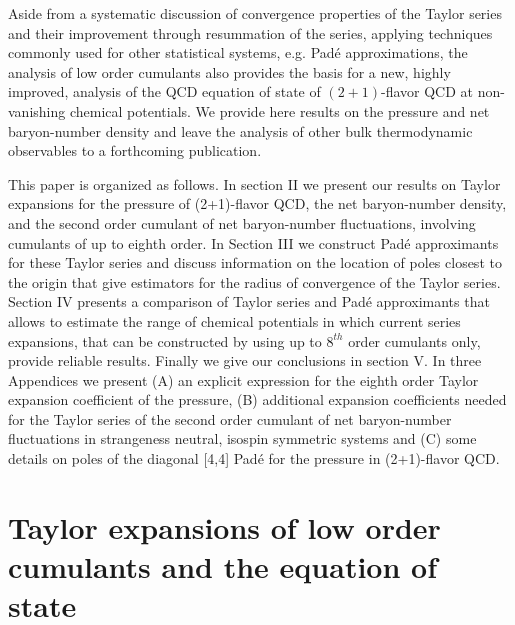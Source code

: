 \documentclass[pdflatex,prd,twocolumn,showpacs,superscriptaddress,nofootinbib]{revtex4-1}
\begin{document}
Aside from a systematic discussion of convergence properties of the Taylor series and their improvement through resummation of the 
series, applying techniques commonly used for other statistical
systems, e.g. Pad\'e approximations,
the analysis of low order 
cumulants also provides the basis for a new, highly improved, 
analysis of the QCD equation of state of $(2+1)$-flavor QCD at non-vanishing chemical potentials. 
We provide here results on the pressure and 
net baryon-number density and leave the analysis
of other bulk thermodynamic observables to a forthcoming publication.

This paper is organized as follows. In section II 
we present our results on Taylor expansions for 
the pressure of (2+1)-flavor QCD, the net baryon-number density, and
the second order cumulant of net baryon-number fluctuations, involving cumulants of up to eighth order. In Section III we construct
Pad\'e approximants for these Taylor series
and discuss information on the location of poles closest to the origin that give estimators for the radius of convergence of the Taylor series. Section IV presents a comparison of Taylor series and Pad\'e approximants that allows to estimate the range of chemical potentials in which current series expansions, that can be 
constructed by using up to $8^{th}$ order cumulants only, provide reliable results. Finally we give our conclusions in section V. In three Appendices we
present (A) an explicit expression for the eighth order Taylor expansion coefficient of the pressure, (B) additional expansion coefficients needed for the Taylor series of the second order cumulant of net baryon-number fluctuations in strangeness neutral, isospin symmetric systems and (C)
some details on poles of the diagonal [4,4] Pad\'e for the pressure in (2+1)-flavor QCD. 


\section{Taylor expansions of low order cumulants and the equation of state}
\end{document}
